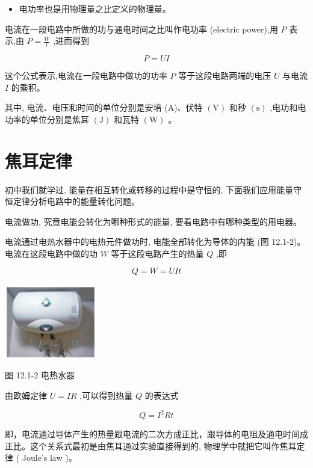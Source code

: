 \documentclass[10pt]{article}
\begin{document}
\begin{mdframed}

\begin{itemize}
\item 电功率也是用物理量之比定义的物理量。
\end{itemize}

\end{mdframed}

电流在一段电路中所做的功与通电时间之比叫作电功率 (electric power),用 \(P\) 表示,由 \(P = \frac{W}{t}\) ,进而得到

\[
P = {UI}
\]

这个公式表示,电流在一段电路中做功的功率 \(P\) 等于这段电路两端的电压 \(U\) 与电流 \(I\) 的乘积。

其中, 电流、电压和时间的单位分别是安培 (A)、伏特 \(\left( \mathrm{V}\right)\) 和秒 \(\left( \mathrm{s}\right)\) ,电功和电功率的单位分别是焦耳 \(\left( \mathrm{J}\right)\) 和瓦特 \(\left( \mathrm{W}\right)\) 。

\section*{焦耳定律}

初中我们就学过, 能量在相互转化或转移的过程中是守恒的, 下面我们应用能量守恒定律分析电路中的能量转化问题。

电流做功, 究竟电能会转化为哪种形式的能量, 要看电路中有哪种类型的用电器。

电流通过电热水器中的电热元件做功时, 电能全部转化为导体的内能 (图 12.1-2)。电流在这段电路中做的功 \(W\) 等于这段电路产生的热量 \(Q\) ,即

\[
Q = W = {UIt}
\]

\begin{center}
\includegraphics[max width=0.3\textwidth]{images/01911d5f-8e38-70c0-b5b8-2b399bd115b6_85_533689.jpg}
\end{center}

图 12.1-2 电热水器

由欧姆定律 \(U = {IR}\) ,可以得到热量 \(Q\) 的表达式

\[
Q = {I}^{2}{Rt}
\]

即，电流通过导体产生的热量跟电流的二次方成正比，跟导体的电阻及通电时间成正比。这个关系式最初是由焦耳通过实验直接得到的, 物理学中就把它叫作焦耳定律 ( Joule's law )。
\end{document}
